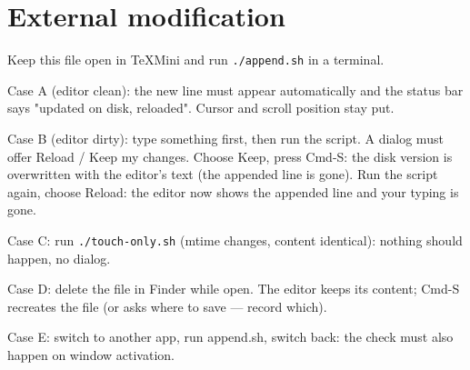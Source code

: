 \documentclass{article}
\begin{document}
\section{External modification}
Keep this file open in TeXMini and run \texttt{./append.sh} in a terminal.

Case A (editor clean): the new line must appear automatically and the status
bar says "updated on disk, reloaded". Cursor and scroll position stay put.

Case B (editor dirty): type something first, then run the script. A dialog
must offer Reload / Keep my changes. Choose Keep, press Cmd-S: the disk version is
overwritten with the editor's text (the appended line is gone). Run the script
again, choose Reload: the editor now shows the appended line and your typing is gone.

Case C: run \texttt{./touch-only.sh} (mtime changes, content identical): nothing
should happen, no dialog.

Case D: delete the file in Finder while open. The editor keeps its content; Cmd-S
recreates the file (or asks where to save --- record which).

Case E: switch to another app, run append.sh, switch back: the check must also
happen on window activation.

\end{document}
